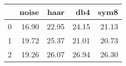 \begin{tabular}{lrrrr}
\toprule
{} &  noise &   haar &    db4 &   sym8 \\
\midrule
0 &  16.90 &  22.95 &  24.15 &  21.13 \\
1 &  19.72 &  25.37 &  21.01 &  20.73 \\
2 &  19.26 &  26.07 &  26.94 &  26.30 \\
\bottomrule
\end{tabular}
